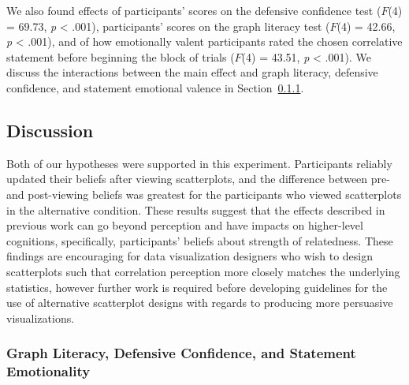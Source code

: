 \documentclass[sigconf]{acmart}
\begin{document}
We also found effects of participants' scores on the defensive
confidence test (\(F\)(4) = 69.73, \emph{p} \textless{} .001),
participants' scores on the graph literacy test (\(F\)(4) = 42.66,
\emph{p} \textless{} .001), and of how emotionally valent participants
rated the chosen correlative statement before beginning the block of
trials (\(F\)(4) = 43.51, \emph{p} \textless{} .001). We discuss the
interactions between the main effect and graph literacy, defensive
confidence, and statement emotional valence in
Section~\ref{sec-add-analyses-discussion}.

\subsection{Discussion}\label{sec-main-discussion}

Both of our hypotheses were supported in this experiment. Participants
reliably updated their beliefs after viewing scatterplots, and the
difference between pre- and post-viewing beliefs was greatest for the
participants who viewed scatterplots in the alternative condition. These
results suggest that the effects described in previous work can go
beyond perception and have impacts on higher-level cognitions,
specifically, participants' beliefs about strength of relatedness. These
findings are encouraging for data visualization designers who wish to
design scatterplots such that correlation perception more closely
matches the underlying statistics, however further work is required
before developing guidelines for the use of alternative scatterplot
designs with regards to producing more persuasive visualizations.

\subsubsection{Graph Literacy, Defensive Confidence, and Statement
Emotionality}\label{sec-add-analyses-discussion}
\end{document}

